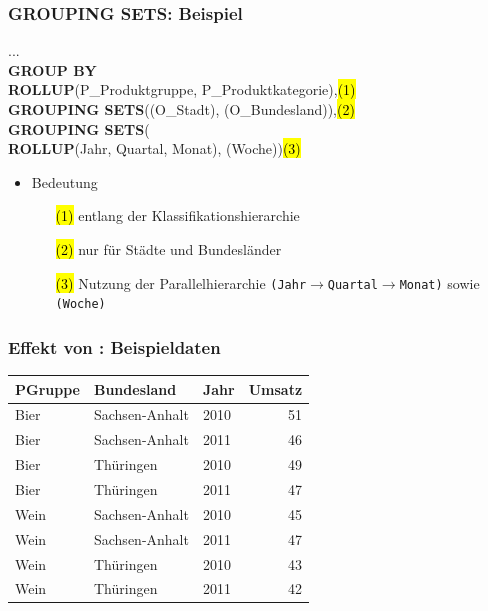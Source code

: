     
    \begin{frame}
    
    \frametitle{GROUPING SETS: Beispiel}
    
    
    \begin{sql}
        ...\\
        \textbf{GROUP BY}\\
        \1	  \textbf{ROLLUP}(P\_Produktgruppe, P\_Produktkategorie),\hl{(1)}\\
        \1    \textbf{GROUPING SETS}((O\_Stadt), (O\_Bundesland)),\hl{(2)}\\
        \1    \textbf{GROUPING SETS}(		\\
        \2 \textbf{ROLLUP}(Jahr, Quartal, Monat), (Woche))\hl{(3)}
      \end{sql}
    
    \begin{itemize}
    \item Bedeutung
      \begin{itemize}
      \item[\hl{(1)}] entlang der Klassifikationshierarchie
      \item[\hl{(2)}] nur für Städte und Bundesländer
      \item[\hl{(3)}] Nutzung der Parallelhierarchie
        \texttt{(Jahr$\to$Quartal$\to$Monat)} sowie \texttt{(Woche)}
      \end{itemize}
    
    \end{itemize}
    
    
    \end{frame}
    
    
    \begin{frame}
    
      \frametitle{Effekt von : Beispieldaten}
    
      \begin{center}
      \begin{tabular}{|l|l|l|r|}
        \hline
      \rowcolor{Gray} \textbf{PGruppe} &  \textbf{Bundesland} & \textbf{Jahr} & \textbf{Umsatz} \\
    \hline\hline
    Bier &	Sachsen-Anhalt &	2010	& 51 \\
    Bier &	Sachsen-Anhalt &	2011 &	46 \\
    Bier &	Thüringen	& 2010	& 49 \\
    Bier &	Thüringen	& 2011	& 47 \\
    Wein &	Sachsen-Anhalt	& 2010	& 45 \\
    Wein &	Sachsen-Anhalt	& 2011 & 	47 \\
    Wein &	Thüringen	& 2010	& 43 \\
    Wein &	Thüringen	& 2011	& 42 \\
    \hline
      \end{tabular}
    \end{center}
    
    \end{frame}
    
